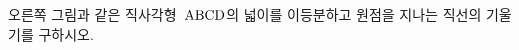 \noindent\begin{minipage}[t]{0.58\linewidth}\vspace{0pt}\raggedright 오른쪽 그림과 같은 직사각형~$\mathrm{ABCD}$의 넓이를 이등분하고 원점을 지나는 직선의 기울기를 구하시오.\end{minipage}\hfill\begin{minipage}[t]{0.4\linewidth}\vspace{0pt}\centering \resizebox{\ifdim\width>\linewidth\linewidth\else\width\fi}{!}{}\end{minipage}\par
